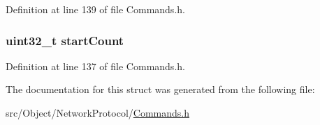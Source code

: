 Definition at line 139 of file Commands.h.

\hypertarget{struct_cmd_get_headers_a3393c33019315a8d7ff4d5e48b0577e8}{
\subsubsection[{startCount}]{\setlength{\rightskip}{0pt plus 5cm}uint32\_\-t {\bf startCount}}}
\label{struct_cmd_get_headers_a3393c33019315a8d7ff4d5e48b0577e8}


Definition at line 137 of file Commands.h.



The documentation for this struct was generated from the following file:\begin{DoxyCompactItemize}
\item 
src/Object/NetworkProtocol/\hyperlink{_commands_8h}{Commands.h}\end{DoxyCompactItemize}
